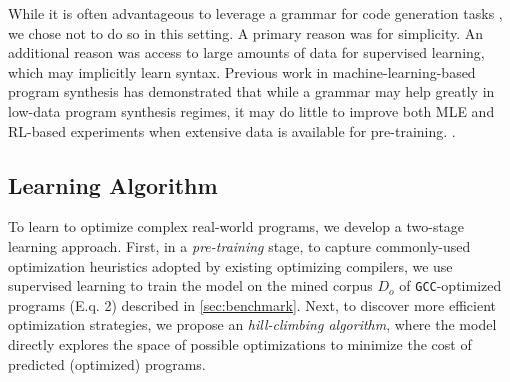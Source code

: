 \documentclass{article}
\begin{document}

While it is often advantageous to leverage a grammar for code generation tasks \citep{parisotto2016neuro,yin-neubig-2017-syntactic}, we chose not to do so in this setting. A primary reason was for simplicity. An additional reason was access to large amounts of data for supervised learning, which may implicitly learn syntax. Previous work in machine-learning-based program synthesis has demonstrated that while a grammar may help greatly in low-data program synthesis regimes, it may do little to improve both MLE and RL-based experiments when extensive data is available for pre-training. 
\cite{bunel2018leveraging}.

\subsection{Learning Algorithm}

To learn to optimize complex real-world programs, we develop a two-stage learning approach.
First, in a \emph{pre-training} stage, to capture commonly-used optimization heuristics adopted by existing optimizing compilers, we use supervised learning to train the model on the mined corpus $D_o$ of \texttt{GCC}-optimized programs (E.q. 2) described in \cref{sec:benchmark}. 
Next, to discover more efficient optimization strategies, we propose an  \emph{hill-climbing algorithm}, where the model directly explores the space of possible optimizations to minimize the cost of predicted (optimized) programs.
\end{document}
